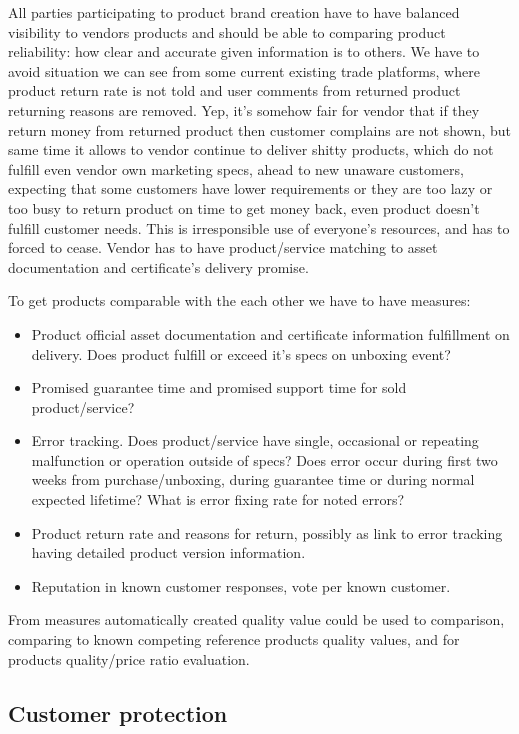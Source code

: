All parties participating to product brand creation have to have balanced visibility to vendors products and should be able to comparing product reliability: how clear and accurate given information is to others. We have to avoid situation we can see from some current existing trade platforms, where product return rate is not told and user comments from returned product returning reasons are removed. Yep, it's somehow fair for vendor that if they return money from returned product then customer complains are not shown, but same time it allows to vendor continue to deliver shitty products, which do not fulfill even vendor own marketing specs, ahead to new unaware customers, expecting that some customers have lower requirements or they are too lazy or too busy to return product on time to get money back, even product doesn't fulfill customer needs. This is irresponsible use of everyone's resources, and has to forced to cease. Vendor has to have product/service matching to asset documentation and certificate's delivery promise.

To get products comparable with the each other we have to have measures:
\begin{itemize}
\item Product official asset documentation and certificate information fulfillment on delivery. Does product fulfill or exceed it's specs on unboxing event?
\item Promised guarantee time and promised support time for sold product/service?
\item Error tracking. Does product/service have single, occasional or repeating malfunction or operation outside of specs? Does error occur during first two weeks from purchase/unboxing, during guarantee time or during normal expected lifetime? What is error fixing rate for noted errors?
\item Product return rate and reasons for return, possibly as link to error tracking having detailed product version information.
\item Reputation in known customer responses, vote per known customer.
\end{itemize}

From measures automatically created quality value could be used to comparison, comparing to known competing reference products quality values, and for products quality/price ratio evaluation.

\subsection{Customer protection}
\label{customer_protection}

